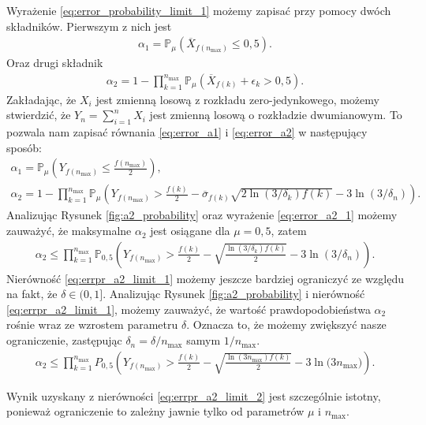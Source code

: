 \documentclass[inzynierska]{pwr_wmat_praca_dyplomowa}
\theoremstyle{plain}
\numberwithin{theorem}{chapter}
\theoremstyle{definition}
\numberwithin{theorem}{chapter}
\newcommand{\probP}{\mathbb{P}}
\newcommand{\nmax}{n_{\text{max}}}
\begin{document}
	Wyrażenie \eqref{eq:error_probability_limit_1} możemy zapisać przy pomocy dwóch składników. Pierwszym z nich jest 
	\begin{gather}
		\alpha_1 = \label{eq:error_a1}
		\probP_{\mu}(\overline{X}_{f(\nmax)} \le 0,5).
	\end{gather}
	Oraz drugi składnik
	\begin{gather}
		\label{eq:error_a2}
		\alpha_2 = 1 - \prod^{\nmax}_{k=1} \probP_{\mu}(\overline{X}_{f(k)} +  \epsilon_{k} > 0,5).
	\end{gather}
	Zakładając, że $X_i$ jest zmienną losową z rozkładu zero-jedynkowego, możemy stwierdzić, że $Y_n = \sum_{i=1}^{n}X_i$ jest zmienną losową o rozkładzie dwumianowym. To pozwala nam zapisać równania \eqref{eq:error_a1} i \eqref{eq:error_a2} w następujący sposób:
	\begin{gather}
		\label{eq:error_a1_1}
		\alpha_1 = \probP_{\mu}\left( Y_{f(\nmax)} \le  \frac{f(\nmax)}{2} \right), \\
		\label{eq:error_a2_1}
		\alpha_2 = 1 - \prod_{k=1}^{\nmax} \probP_{\mu}\left( Y_{f(\nmax)}  > \frac{f(k)}{2} - \overline{\sigma}_{f(k)} \sqrt{2\ln(3/\delta_k)f(k)} - 3  \ln{(3 / \delta_n)} \right).
	\end{gather}
	Analizując Rysunek \ref{fig:a2_probability} oraz wyrażenie \eqref{eq:error_a2_1} możemy zauważyć, że maksymalne $\alpha_2$ jest osiągane dla $\mu = 0,5$, zatem
	\begin{align}
		\label{eq:errpr_a2_limit_1}
		\alpha_2 \le \prod_{k=1}^{\nmax} \probP_{0,5}\left( Y_{f(\nmax)}  > \frac{f(k)}{2} -  \sqrt{\frac{\ln(3/\delta_k)f(k)}{2}} - 3  \ln{(3 / \delta_n)} \right).
	\end{align}
	Nierówność \eqref{eq:errpr_a2_limit_1} możemy jeszcze bardziej ograniczyć ze względu na fakt, że $\delta\in(0, 1]$. Analizując Rysunek \ref{fig:a2_probability} i nierówność \eqref{eq:errpr_a2_limit_1}, możemy zauważyć, że wartość prawdopodobieństwa $\alpha_2$ rośnie wraz ze wzrostem parametru $\delta$. Oznacza to, że możemy zwiększyć nasze ograniczenie, zastępując $\delta_n = \delta/\nmax$ samym $1/\nmax$.
	\begin{align}
		\label{eq:errpr_a2_limit_2}
		\alpha_2 \le \prod_{k=1}^{\nmax} P_{0,5}\left( Y_{f(\nmax)}  > \frac{f(k)}{2} -  \sqrt{\frac{\ln(3\nmax)f(k)}{2}} - 3  \ln{(3\nmax})  \right).
	\end{align}

	Wynik uzyskany z nierówności \eqref{eq:errpr_a2_limit_2} jest szczególnie istotny, ponieważ ograniczenie to zależny jawnie tylko od parametrów $\mu$ i $\nmax$.
\end{document}
